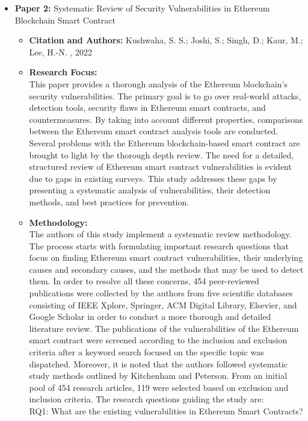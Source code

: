 \documentclass[12pt,a4paper]{article}
\begin{document}
\begin{itemize}
    \item \textbf{Paper 2:} Systematic Review of Security Vulnerabilities in Ethereum Blockchain Smart Contract
    \begin{itemize}
        \item \textbf{Citation and Authors:} Kushwaha, S. S.; Joshi, S.; Singh, D.; Kaur, M.; Lee, H.-N. 
        \cite{kushwaha_2022_systematic}, 2022
        \item \textbf{Research Focus:} \\
        This paper provides a thorough analysis of the Ethereum blockchain's security vulnerabilities. The primary goal is to go over real-world attacks, detection tools, security flaws in Ethereum smart contracts, and countermeasures. By taking into account different properties, comparisons between the Ethereum smart contract analysis tools are conducted. Several problems with the Ethereum blockchain-based smart contract are brought to light by the thorough depth review. The need for a detailed, structured review of Ethereum smart contract vulnerabilities is evident due to gaps in existing surveys. This study addresses these gaps by presenting a systematic analysis of vulnerabilities, their detection methods, and best practices for prevention.
        \item \textbf{Methodology:} \\
        The authors of this study implement a systematic review methodology. The process starts with formulating important research questions that focus on finding Ethereum smart contract vulnerabilities, their underlying causes and secondary causes, and the methods that may be used to detect them. In order to resolve all these concerns, 454 peer-reviewed publications were collected by the authors from five scientific databases consisting of IEEE Xplore, Springer, ACM Digital Library,  Elsevier, and Google Scholar in order to conduct a more thorough and detailed literature review. The publications of the vulnerabilities of the Ethereum smart contract were screened according to the inclusion and exclusion criteria after a keyword search focused on the specific topic was dispatched.
        Moreover, it is noted that the authors followed systematic study methods outlined by Kitchenham and Peterson. From an initial pool of 454 research articles, 119 were selected based on exclusion and inclusion criteria. The research questions guiding the study are:
        \\
RQ1: What are the existing vulnerabilities in Ethereum Smart Contracts?
\\

\end{itemize}
\end{itemize}
\end{document}
